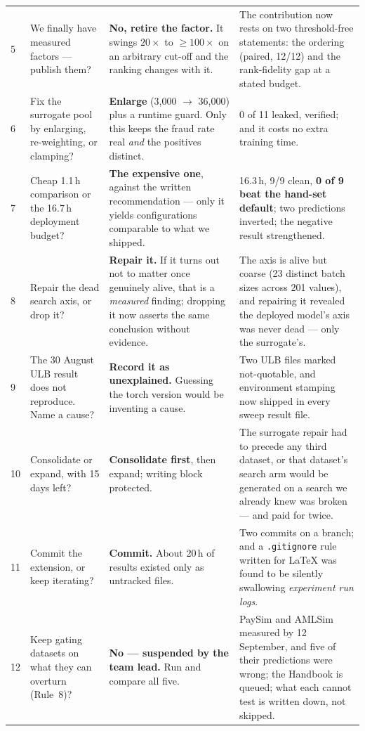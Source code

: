 \documentclass[11pt]{article}
\begin{document}
{\begin{xltabular}{\linewidth}{@{}p{0.35cm} >{\raggedright\arraybackslash}p{3.1cm} >{\raggedright\arraybackslash}p{4.4cm} X@{}}
5 & We finally have measured factors --- publish them? & \textbf{No, retire the factor.} It swings $20\times$ to $\ge100\times$ on an arbitrary cut-off and the ranking changes with it. & The contribution now rests on two threshold-free statements: the ordering (paired, 12/12) and the rank-fidelity gap at a stated budget. \\
6 & Fix the surrogate pool by enlarging, re-weighting, or clamping? & \textbf{Enlarge} (3{,}000 $\to$ 36{,}000) plus a runtime guard. Only this keeps the fraud rate real \emph{and} the positives distinct. & 0 of 11 leaked, verified; and it costs no extra training time. \\
7 & Cheap 1.1\,h comparison or the 16.7\,h deployment budget? & \textbf{The expensive one}, against the written recommendation --- only it yields configurations comparable to what we shipped. & 16.3\,h, 9/9 clean, \textbf{0 of 9 beat the hand-set default}; two predictions inverted; the negative result strengthened. \\
8 & Repair the dead search axis, or drop it? & \textbf{Repair it.} If it turns out not to matter once genuinely alive, that is a \emph{measured} finding; dropping it now asserts the same conclusion without evidence. & The axis is alive but coarse (23 distinct batch sizes across 201 values), and repairing it revealed the deployed model's axis was never dead --- only the surrogate's. \\
9 & The 30 August ULB result does not reproduce. Name a cause? & \textbf{Record it as unexplained.} Guessing the torch version would be inventing a cause. & Two ULB files marked not-quotable, and environment stamping now shipped in every sweep result file. \\
10 & Consolidate or expand, with 15 days left? & \textbf{Consolidate first}, then expand; writing block protected. & The surrogate repair had to precede any third dataset, or that dataset's search arm would be generated on a search we already knew was broken --- and paid for twice. \\
11 & Commit the extension, or keep iterating? & \textbf{Commit.} About 20\,h of results existed only as untracked files. & Two commits on a branch; and a \texttt{.gitignore} rule written for LaTeX was found to be silently swallowing \emph{experiment run logs}. \\
12 & Keep gating datasets on what they can overturn (Rule~8)? & \textbf{No --- suspended by the team lead.} Run and compare all five. & PaySim and AMLSim measured by 12 September, and five of their predictions were wrong; the Handbook is queued; what each cannot test is written down, not skipped. \\

\end{xltabular}}
\end{document}
